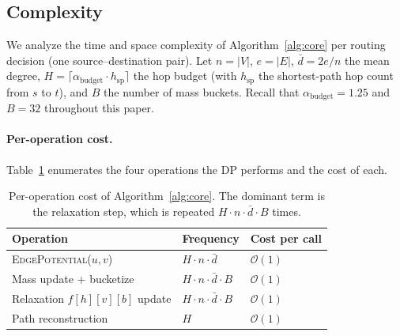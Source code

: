 %

\subsection{Complexity}
\label{subsec:complexity}

We analyze the time and space complexity of
Algorithm~\ref{alg:core} per routing decision (one
source--destination pair). Let $n = |V|$, $e = |E|$, $\bar{d} =
2e/n$ the mean degree, $H = \lceil \alpha_{\text{budget}}
\cdot h_{\text{sp}}\rceil$ the hop budget (with $h_{\text{sp}}$
the shortest-path hop count from $s$ to $t$), and $B$ the number
of mass buckets. Recall that
$\alpha_{\text{budget}} = 1.25$ and $B = 32$ throughout this paper.

\paragraph{Per-operation cost.}
Table~\ref{tab:complexity} enumerates the four operations the DP
performs and the cost of each.

\begin{table}[h]
\centering
\caption{Per-operation cost of Algorithm~\ref{alg:core}.
The dominant term is the relaxation step, which is repeated
$H \cdot n \cdot \bar{d} \cdot B$ times.}
\label{tab:complexity}
\small
\begin{tabular}{lll}
\toprule
Operation & Frequency & Cost per call \\
\midrule
\textsc{EdgePotential}($u,v$) & $H \cdot n \cdot \bar{d}$ & $\mathcal{O}(1)$ \\
Mass update + bucketize       & $H \cdot n \cdot \bar{d} \cdot B$ & $\mathcal{O}(1)$ \\
Relaxation $f[h][v][b]$ update & $H \cdot n \cdot \bar{d} \cdot B$ & $\mathcal{O}(1)$ \\
Path reconstruction           & $H$ & $\mathcal{O}(1)$ \\
\bottomrule
\end{tabular}
\end{table}

